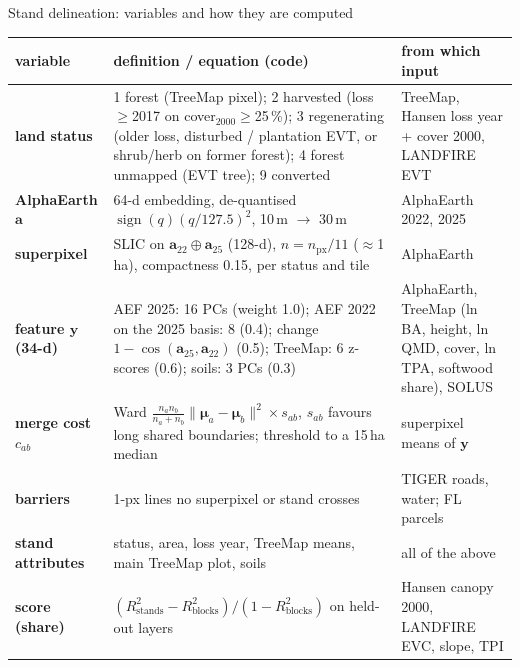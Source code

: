 \begin{frame}{Stand delineation: variables and how they are computed}
\scriptsize
\renewcommand{\arraystretch}{1.07}
\begin{tabularx}{\textwidth}{@{}>{\bfseries}p{2.3cm}X>{\raggedright\arraybackslash}p{3.7cm}@{}}
\toprule
variable & definition / equation (code) & from which input \\
\midrule
land status & 1 forest (TreeMap pixel); 2 harvested (loss $\ge$2017 on cover$_{2000}\ge$25\,\%); 3 regenerating (older loss, disturbed / plantation EVT, or shrub/herb on former forest); 4 forest unmapped (EVT tree); 9 converted & TreeMap, Hansen loss year + cover 2000, LANDFIRE EVT \\
AlphaEarth $\mathbf a$ & 64-d embedding, de-quantised $\operatorname{sign}(q)(q/127.5)^2$, 10\,m $\rightarrow$ 30\,m & AlphaEarth 2022, 2025 \\
superpixel & SLIC on $\mathbf a_{22}\oplus\mathbf a_{25}$ (128-d), $n=n_{\text{px}}/11$ ($\approx$1\,ha), compactness 0.15, per status and tile & AlphaEarth \\
feature $\mathbf y$ (34-d) & AEF 2025: 16 PCs (weight 1.0); AEF 2022 on the 2025 basis: 8 (0.4); change $1-\cos(\mathbf a_{25},\mathbf a_{22})$ (0.5); TreeMap: 6 z-scores (0.6); soils: 3 PCs (0.3) & AlphaEarth, TreeMap (ln BA, height, ln QMD, cover, ln TPA, softwood share), SOLUS \\
merge cost $c_{ab}$ & Ward $\frac{n_an_b}{n_a+n_b}\lVert\boldsymbol\mu_a-\boldsymbol\mu_b\rVert^2\times s_{ab}$, $s_{ab}$ favours long shared boundaries; threshold to a 15\,ha median & superpixel means of $\mathbf y$ \\
barriers & 1-px lines no superpixel or stand crosses & TIGER roads, water; FL parcels \\
stand attributes & status, area, loss year, TreeMap means, main TreeMap plot, soils & all of the above \\
score (share) & $(R^2_{\text{stands}}-R^2_{\text{blocks}})/(1-R^2_{\text{blocks}})$ on held-out layers & Hansen canopy 2000, LANDFIRE EVC, slope, TPI \\
\bottomrule
\end{tabularx}
\end{frame}
